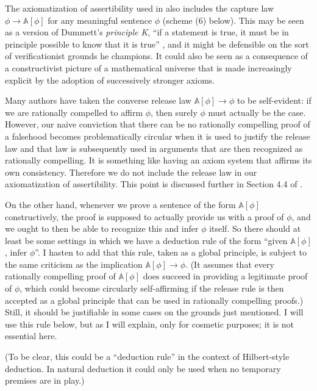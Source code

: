 \documentclass{amsart}
\theoremstyle{definition}
\begin{document}
The axiomatization of assertibility used in \cite{weaver} also includes the capture law $\phi \to \mathbb{A}[\phi]$ for any meaningful sentence $\phi$ (scheme (6) below). This may be seen as a version of Dummett's {\it principle K}, ``if a statement is true, it must be in principle possible to know that it is true'' \cite{dummett}, and it might be defensible on the sort of verificationist grounds he champions. It could also be seen as a consequence of a constructivist picture of a mathematical universe that is made increasingly explicit by the adoption of successively stronger axioms.

Many authors have taken the converse release law $\mathbb{A}[\phi] \to \phi$ to be self-evident: if we are rationally compelled to affirm $\phi$, then surely $\phi$ must actually be the case. However, our naive conviction that there can be no rationally compelling proof of a falsehood becomes problematically circular when it is used to justify the release law and that law is subsequently used in arguments that are then recognized as rationally compelling. It is something like having an axiom system that affirms its own consistency. Therefore we do not include the release law in our axiomatization of assertibility. This point is discussed further in Section 4.4 of \cite{weaver}.

On the other hand, whenever we prove a sentence of the form $\mathbb{A}[\phi]$ constructively, the proof is supposed to actually provide us with a proof of $\phi$, and we ought to then be able to recognize this and infer $\phi$ itself. So there should at least be some settings in which we have a deduction rule of the form ``given $\mathbb{A}[\phi]$, infer $\phi$''. I hasten to add that this rule, taken as a global principle, is subject to the same criticism as the implication $\mathbb{A}[\phi] \to \phi$. (It assumes that every rationally compelling proof of $\mathbb{A}[\phi]$ does succeed in providing a legitimate proof of $\phi$, which could become circularly self-affirming if the release rule is then accepted as a global principle that can be used in rationally compelling proofs.) Still, it should be justifiable in some cases on the grounds just mentioned. I will use this rule below, but as I will explain, only for cosmetic purposes; it is not essential here.

(To be clear, this could be a ``deduction rule'' in the context of Hilbert-style deduction. In natural deduction it could only be used when no temporary premises are in play.)
\end{document}
